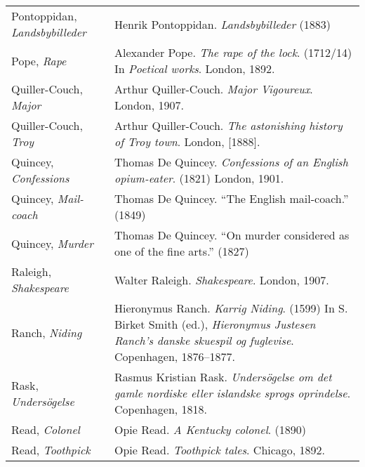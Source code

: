 \begin{longtable}{p{} p{}}
\raggedright {Pontoppidan, \textit{Landsbybilleder}} & Henrik Pontoppidan. \textit{Landsbybilleder} (1883)\\

Pope, \textit{Rape} & Alexander Pope. \textit{The rape of the lock}. (1712/14) In \textit{Poetical works}. London, 1892. \\

Quiller-Couch, \textit{Major} & Arthur Quiller-Couch. \textit{Major Vigoureux}. London, 1907.  \\
Quiller-Couch, \textit{Troy} & Arthur Quiller-Couch. \textit{The astonishing history of Troy town}. London, {[}1888{]}. \\

Quincey, \textit{Confessions} & Thomas De Quincey. \textit{Confessions of an English opium-eater}. (1821) London, 1901. \\
Quincey, \textit{Mail-coach} & Thomas De Quincey. ``The English mail-coach.'' (1849) \\
Quincey, \textit{Murder} & Thomas De Quincey. ``On murder considered as one of the fine arts.'' (1827) \\

Raleigh, \textit{Shakespeare} & Walter Raleigh. \textit{Shakespeare}. London, 1907. \\

Ranch, \textit{Niding} & Hieronymus Ranch. \textit{Karrig Niding}. (1599) In S. Birket Smith (ed.), \textit{Hieronymus Justesen Ranch's danske skuespil og fuglevise}. Copenhagen, 1876--1877. \\ %

Rask, \textit{Undersögelse} & Rasmus Kristian Rask. \textit{Undersögelse om det gamle nordiske eller islandske sprogs oprindelse}. Copenhagen, 1818. \\
%

Read, \textit{Colonel} & Opie Read. \textit{A Kentucky colonel}. (1890) \\
Read, \textit{Toothpick} & Opie Read. \textit{Toothpick tales}. Chicago, 1892. \\


\end{longtable}
